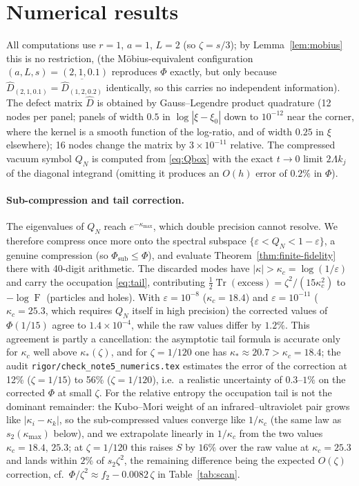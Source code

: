 \documentclass[11pt]{article}
\theoremstyle{accent}
\theoremstyle{definition}
\newcommand{\Tr}{\operatorname{Tr}}
\newcommand{\eps}{\varepsilon}
\newcommand{\Fid}{\operatorname{F}}
\begin{document}
\section{Numerical results}\label{sec:numerics}

All computations use \(r=1\), \(a=1\), \(L=2\) (so \(\zeta=s/3\)); by Lemma~\ref{lem:mobius} this is no restriction, (the M\"obius-equivalent configuration \((a,L,s)=(2,1,0.1)\) reproduces \(\Phi\) exactly, but only because \(\widehat D_{(2,1,0.1)}=\overline{\widehat D_{(1,2,0.2)}}\) identically, so this carries no independent information).  The defect matrix \(\widehat D\) is obtained by Gauss--Legendre product quadrature (12 nodes per panel; panels of width \(0.5\) in \(\log|\xi-\xi_0|\) down to \(10^{-12}\) near the corner, where the kernel is a smooth function of the log-ratio, and of width \(0.25\) in \(\xi\) elsewhere); 16 nodes change the matrix by \(3\times10^{-11}\) relative.  The compressed vacuum symbol \(Q_N\) is computed from \eqref{eq:Qbox} with the exact \(t\to0\) limit \(2\Lambda k_j\) of the diagonal integrand (omitting it produces an \(O(h)\) error of \(0.2\%\) in \(\Phi\)).

\paragraph{Sub-compression and tail correction.}
The eigenvalues of \(Q_N\) reach \(e^{-\kappa_{\max}}\), which double precision cannot resolve.  We therefore compress once more onto the spectral subspace \(\{\eps<Q_N<1-\eps\}\), a genuine compression (so \(\Phi_{\mathrm{sub}}\le\Phi\)), and evaluate Theorem~\ref{thm:finite-fidelity} there with 40-digit arithmetic.  The discarded modes have \(|\kappa|>\kappa_c=\log(1/\eps)\) and carry the occupation \eqref{eq:tail}, contributing \(\frac12\Tr(\text{excess})=\zeta^2/(15\kappa_c^2)\) to \(-\log\Fid\) (particles and holes).  With \(\eps=10^{-8}\) (\(\kappa_c=18.4\)) and \(\eps=10^{-11}\) (\(\kappa_c=25.3\), which requires \(Q_N\) itself in high precision) the corrected values of \(\Phi(1/15)\) agree to \(1.4\times10^{-4}\), while the raw values differ by \(1.2\%\).  This agreement is partly a cancellation: the asymptotic tail formula is accurate only for \(\kappa_c\) well above \(\kappa_*(\zeta)\), and for \(\zeta=1/120\) one has \(\kappa_*\approx20.7>\kappa_c=18.4\); the audit \texttt{rigor/check\_note5\_numerics.tex} estimates the error of the correction at 12\% (\(\zeta=1/15\)) to 56\% (\(\zeta=1/120\)), i.e.\ a realistic uncertainty of \(0.3\)--\(1\%\) on the corrected \(\Phi\) at small \(\zeta\).  For the relative entropy the occupation tail is not the dominant remainder: the Kubo--Mori weight of an infrared--ultraviolet pair grows like \(|\kappa_i-\kappa_k|\), so the sub-compressed values converge like \(1/\kappa_c\) (the same law as \(s_2(\kappa_{\max})\) below), and we extrapolate linearly in \(1/\kappa_c\) from the two values \(\kappa_c=18.4,\,25.3\); at \(\zeta=1/120\) this raises \(S\) by \(16\%\) over the raw value at \(\kappa_c=25.3\) and lands within \(2\%\) of \(s_2\zeta^2\), the remaining difference being the expected \(O(\zeta)\) correction, cf.\ \(\Phi/\zeta^2\approx f_2-0.0082\,\zeta\) in Table~\ref{tab:scan}.
\end{document}
